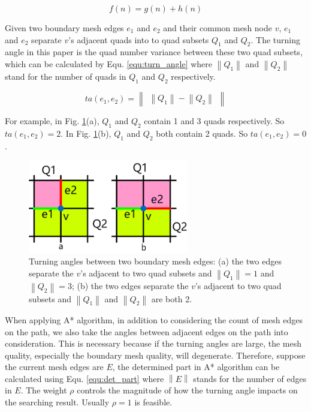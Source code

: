 \documentclass[final,5p,times,twocolumn]{elsarticle}
\begin{document}
\begin{equation}
\label{equ:a_star}
f(n)=g(n) + h(n)
\end{equation}

Given two boundary mesh edges $e_1$ and $e_2$ and their common mesh node $v$, $e_1$ and $e_2$ separate $v$'s adjacent quads into to quad subsets $Q_1$ and $Q_2$. The turning angle in this paper is the quad number variance between these two quad subsets, which can be calculated by Equ. \ref{equ:turn_angle} where $\left \| Q_1 \right \|$ and $\left \| Q_2 \right \|$ stand for the number of quads in $Q_1$ and $Q_2$ respectively.

\begin{equation}
\label{equ:turn_angle}
ta(e_1,e_2)=\begin{Vmatrix}
\left \| Q_1 \right \| - \left \| Q_2 \right \|
\end{Vmatrix}
\end{equation}

For example, in Fig. \ref{fig:turning_angle}(a), $Q_1$ and $Q_2$ contain 1 and 3 quads respectively. So $ta(e_1,e_2)=2$. In Fig. \ref{fig:turning_angle}(b), $Q_1$ and $Q_2$ both contain 2 quads. So $ta(e_1,e_2)=0$.

\begin{figure}[htbp]
\begin{center}
\includegraphics[width=7cm]{turning_angle.png}
\caption{Turning angles between two boundary mesh edges: (a) the two edges separate the $v$'s adjacent to two quad subsets and $\left \| Q_1 \right \|=1$ and $\left \| Q_2 \right \|=3$; (b) the two edges separate the $v$'s adjacent to two quad subsets and $\left \| Q_1 \right \|$ and $\left \| Q_2 \right \|$ are both 2.}
\label{fig:turning_angle}
\end{center}
\end{figure}

When applying A* algorithm, in addition to considering the count of mesh edges on the path, we also take the angles between adjacent edges on the path into consideration. This is necessary because if the turning angles are large, the mesh quality, especially the boundary mesh quality, will degenerate. Therefore, suppose the current mesh edges are $E$, the determined part in A* algorithm can be calculated using Equ. \ref{equ:det_part} where $\left \| E \right \|$ stands for the number of edges in $E$. The weight $\rho $ controls the magnitude of how the turning angle impacts on the searching result. Usually $\rho =1$ is feasible.
\end{document}
